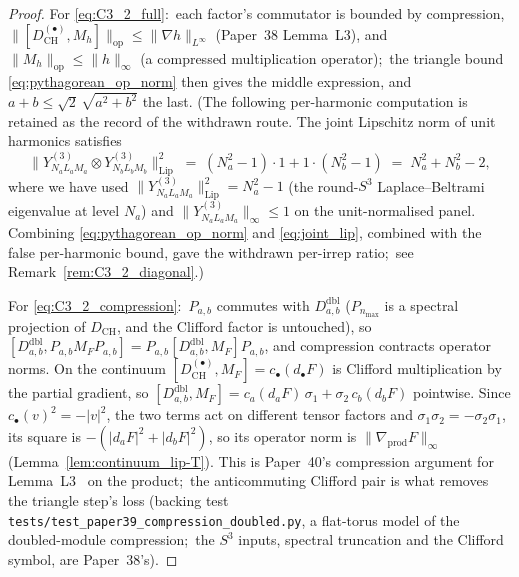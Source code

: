 \documentclass[11pt,a4paper]{article}
\theoremstyle{plain}
\theoremstyle{definition}
\newcommand{\nmax}{n_{\max}}
\newcommand{\sthree}{S^{3}}
\newcommand{\opnorm}[1]{\lVert #1 \rVert_{\mathrm{op}}}
\newcommand{\norm}[1]{\lVert #1 \rVert}
\newcommand{\Mat}{M}
\newcommand{\DCH}{D_{\mathrm{CH}}}
\begin{document}
\begin{proof}
For \eqref{eq:C3_2_full}:\ each factor's commutator is bounded by
compression, $\opnorm{[\DCH^{(\bullet)}, \Mat_h]} \le \norm{\nabla
h}_{L^\infty}$ (Paper~38 Lemma~L3), and $\opnorm{\Mat_h} \le \norm{h}_\infty$
(a compressed multiplication operator);\ the triangle bound
\eqref{eq:pythagorean_op_norm} then gives the middle expression, and
$a + b \le \sqrt 2\,\sqrt{a^2 + b^2}$ the last.  (The following
per-harmonic computation is retained as the record of the withdrawn
route.  The joint Lipschitz norm of unit harmonics satisfies
\begin{equation}\label{eq:joint_lip}
   \norm{Y^{(3)}_{N_a L_a M_a} \otimes Y^{(3)}_{N_b L_b M_b}}_{\mathrm{Lip}}^2
   \;=\; (N_a^2 - 1) \cdot 1 + 1 \cdot (N_b^2 - 1)
   \;=\; N_a^2 + N_b^2 - 2,
\end{equation}
where we have used $\norm{Y^{(3)}_{N_a L_a M_a}}_{\mathrm{Lip}}^2 =
N_a^2 - 1$ (the round-$\sthree$ Laplace--Beltrami eigenvalue at level
$N_a$) and $\norm{Y^{(3)}_{N_a L_a M_a}}_\infty \le 1$ on the
unit-normalised panel. Combining \eqref{eq:pythagorean_op_norm} and
\eqref{eq:joint_lip}, combined with the false per-harmonic bound,
gave the withdrawn per-irrep ratio;\ see
Remark~\ref{rem:C3_2_diagonal}.)

For \eqref{eq:C3_2_compression}:\ $P_{a,b}$ commutes with
$D^{\mathrm{dbl}}_{a,b}$ ($P_{\nmax}$ is a spectral projection of $\DCH$, and
the Clifford factor is untouched), so
$[D^{\mathrm{dbl}}_{a,b}, P_{a,b}\Mat_F P_{a,b}] =
P_{a,b}[D^{\mathrm{dbl}}_{a,b}, \Mat_F]P_{a,b}$, and compression contracts
operator norms. On the continuum $[\DCH^{(\bullet)}, \Mat_F] =
c_\bullet(d_\bullet F)$ is Clifford multiplication by the partial gradient, so
$[D^{\mathrm{dbl}}_{a,b}, \Mat_F] = c_a(d_a F)\,\sigma_1 + \sigma_2\,c_b(d_b F)$
pointwise. Since $c_\bullet(v)^2 = -|v|^2$, the two terms act on different
tensor factors and $\sigma_1\sigma_2 = -\sigma_2\sigma_1$, its square is
$-(|d_a F|^2 + |d_b F|^2)$, so its operator norm is
$\norm{\nabla_{\mathrm{prod}} F}_\infty$
(Lemma~\ref{lem:continuum_lip-T}). This is Paper~40's compression argument
for Lemma~L3~\cite{paper40_unified} on the product;\ the anticommuting
Clifford pair is what removes the triangle step's loss (backing test
\texttt{tests/test\_paper39\_compression\_doubled.py}, a flat-torus model of
the doubled-module compression;\ the $\sthree$ inputs, spectral truncation
and the Clifford symbol, are Paper~38's).
\end{proof}
\end{document}

